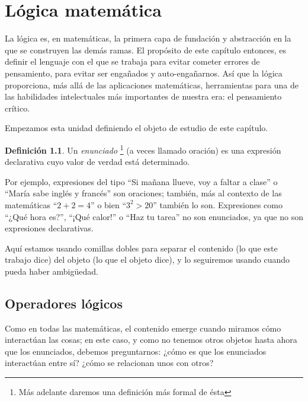 \documentclass{book}
\theoremstyle{definition}
\newtheorem{df}{Definición}[chapter]
\begin{document}
\chapter{Lógica matemática}
La lógica es, en matemáticas, la primera capa de fundación y abstracción en la que se construyen las demás ramas.
El propósito de este capítulo entonces, es definir el lenguaje con el que se trabaja para evitar cometer errores de pensamiento, para evitar ser engañados y auto-engañarnos.
Así que la lógica proporciona, más allá de las aplicaciones matemáticas, herramientas para una de las habilidades intelectuales más importantes de nuestra era: el pensamiento crítico.

Empezamos esta unidad definiendo el objeto de estudio de este capítulo.
\begin{df}
	Un \emph{enunciado}
		\footnote{Más adelante daremos una definición más formal de ésta} %
		(a veces llamado oración) es una expresión declarativa cuyo valor de verdad está determinado.
\end{df}

Por ejemplo, expresiones del tipo ``Si mañana llueve, voy a faltar a clase'' o ``María sabe inglés y francés'' son oraciones; también, más al contexto de las matemáticas ``$2+2=4$'' o bien ``$3^2 > 20$'' también lo son.
Expresiones como ``¿Qué hora es?'', ``¡Qué calor!'' o ``Haz tu tarea'' no son enunciados, ya que no son expresiones declarativas.

Aquí estamos usando comillas dobles para separar el contenido (lo que este trabajo dice) del objeto (lo que el objeto dice), y lo seguiremos usando cuando pueda haber ambigüedad.

\section{Operadores lógicos}

Como en todas las matemáticas, el contenido emerge cuando miramos cómo interactúan las cosas; en este caso, y como no tenemos otros objetos hasta ahora que los enunciados, debemos preguntarnos: ¿cómo es que los enunciados interactúan entre sí? ¿cómo se relacionan unos con otros?
\end{document}
